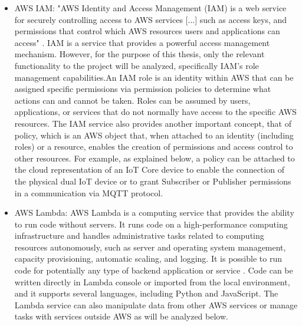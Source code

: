 \begin{itemize}
    \item AWS IAM: "AWS Identity and Access Management (IAM) is a web service for securely controlling access to AWS services [...] such as access keys, and permissions that control which AWS resources users and applications can access" \cite{AWSIAM}. IAM is a service that provides a powerful access management mechanism. However, for the purpose of this thesis, only the relevant functionality to the project will be analyzed, specifically IAM's role management capabilities.An IAM role is an identity within AWS that can be assigned specific permissions via permission policies to determine what actions can and cannot be taken. Roles can be assumed by users, applications, or services that do not normally have access to the specific AWS resources. The IAM service also provides another important concept, that of policy, which is an AWS object that, when attached to an identity (including roles) or a resource, enables the creation of permissions and access control to other resources. For example, as explained below, a policy can be attached to the cloud representation of an IoT Core device to enable the connection of the physical dual IoT device or to grant Subscriber or Publisher permissions in a communication via MQTT protocol.
    \item AWS Lambda: AWS Lambda is a computing service that provides the ability to run code without servers. It runs code on a high-performance computing infrastructure and handles administrative tasks related to computing resources autonomously, such as server and operating system management, capacity provisioning, automatic scaling, and logging. It is possible to run code for potentially any type of backend application or service \cite{AWSLambda}. Code can be written directly in Lambda console or imported from the local environment, and it supports several languages, including Python and JavaScript. The Lambda service can also manipulate data from other AWS services or manage tasks with services outside AWS as will be analyzed below.

\end{itemize}
